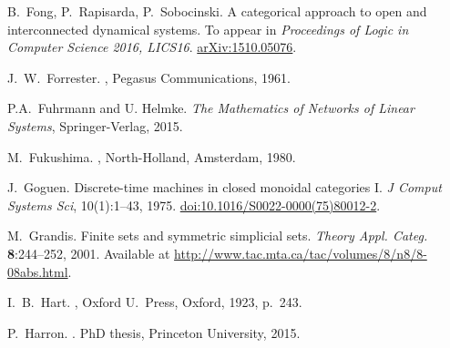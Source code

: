 \begin{thebibliography}{RSW00}
    B.\ Fong, P.\ Rapisarda, P.\ Sobocinski.
    \newblock A categorical approach to open and interconnected dynamical
    systems.
    \newblock To appear in {\sl Proceedings of Logic in Computer Science 2016,
    LICS16}.
    \newblock \href{http://arxiv.org/abs/1510.05076}{arXiv:1510.05076}.

    J.\ W.\ Forrester.
    , Pegasus Communications, 1961. 


    P.A.~Fuhrmann and U. Helmke.
    \newblock \emph{The Mathematics of Networks of Linear Systems},
    Springer-Verlag, 2015. 

    M.\ Fukushima.
    ,
    North-Holland, Amsterdam, 1980.

    J.\ Goguen.
    \newblock Discrete-time machines in closed monoidal categories I.
    \newblock \emph{J Comput Systems Sci}, 10(1):1--43, 1975.
    \newblock
    \href{http://doi.org/10.1016/S0022-0000(75)80012-2}{doi:10.1016/S0022-0000(75)80012-2}.

    M.\ Grandis.
    \newblock Finite sets and symmetric simplicial sets.
    \newblock \textsl{Theory Appl. Categ.} {\bf 8}:244--252, 2001.
    \newblock Available at
    \href{http://www.tac.mta.ca/tac/volumes/8/n8/8-08abs.html}
    {http://www.tac.mta.ca/tac/volumes/8/n8/8-08abs.html}.


    I.\ B.\ Hart.
    , Oxford U.\ Press,
    Oxford, 1923, p.\ 243.

    
    P.\ Harron.
    \newblock .
    \newblock PhD thesis, Princeton University, 2015. 


\end{thebibliography}
